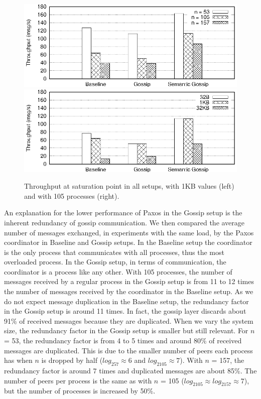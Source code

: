 \begin{figure}[htbp]
\centering
\includegraphics[width=\columnwidth]{figures/throughput-saturation-1kb.eps}
\includegraphics[width=\columnwidth]{figures/throughput-saturation-n105.eps}
\caption{Throughput at saturation point in all setups, with 1KB values (left)
	and with 105 processes (right).}
\label{fig:throughput}
\end{figure}

An explanation for the lower performance of Paxos in the Gossip setup is the
inherent redundancy of gossip communication.
%
We then compared the average number of messages exchanged, in experiments with
the same load, by the Paxos coordinator in Baseline and Gossip setups.
In the Baseline setup the coordinator is the only process that
communicates with all processes, thus the most overloaded process.
In the Gossip setup, in terms of communication, the coordinator is a process
like any other.
%
With 105 processes, the number of messages received by a regular process in the Gossip
setup is from 11 to 12 times the number of messages received by the coordinator
in the Baseline setup.
As we do not expect message duplication in the Baseline setup, the redundancy factor
in the Gossip setup is around 11 times. 
In fact, the gossip layer discards about 91\% of received messages because they
are duplicated.
%
When we vary the system size, the redundancy factor in the Gossip setup is smaller
but still relevant.
%
For $n$ = 53, the redundancy factor is from 4 to 5 times and around 80\% of
received messages are duplicated.
This is due to the smaller number of peers each process has when $n$ is dropped
by half ($log_257 \approx 6$ and $log_2105 \approx 7$).
%
With $n$ = 157, the redundancy factor is around 7 times and duplicated messages
are about 85\%.
The number of peers per process is the same as with $n$ = 105
($log_2105 \approx log_2157 \approx 7$), but the number of processes is
increased by 50\%.

